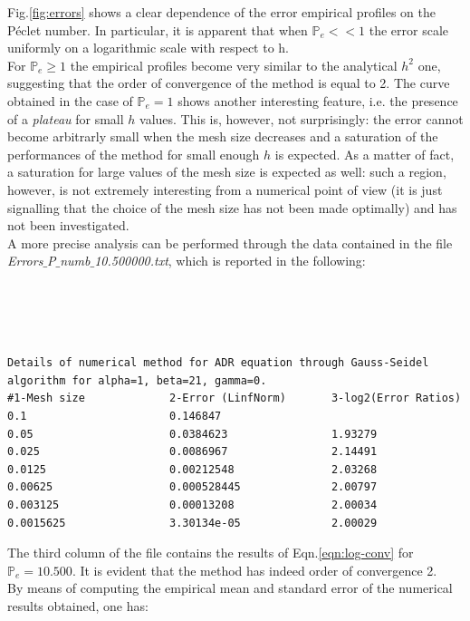 \documentclass[11pt]{article}
\theoremstyle{theorem}
\theoremstyle{definition}
\begin{document}
Fig.\ref{fig:errors} shows a clear dependence of the error empirical profiles on the P\'{e}clet number. In particular, it is apparent that when $\mathbb{P}_e<<1$ the error scale uniformly on a logarithmic scale with respect to h.\\
For $\mathbb{P}_e\ge 1$ the empirical profiles become very similar to the analytical $h^2$ one, suggesting that the order of convergence of the method is equal to 2. The curve obtained in the case of $\mathbb{P}_e=1$ shows another interesting feature, i.e. the presence of a \emph{plateau} for small $h$ values. This is, however, not surprisingly: the error cannot become arbitrarly small when the mesh size decreases and a saturation of the performances of the method for small enough $h$ is expected. As a matter of fact, a saturation for large values of the mesh size is expected as well: such a region, however, is not extremely interesting from a numerical point of view (it is just signalling that the choice of the mesh size has not been made optimally) and has not been investigated.\\
A more precise analysis can be performed through the data contained in the file \emph{Errors$\_$P$\_$numb$\_$10.500000.txt}, which is reported in the following:
\\
\\
\\
\\
\\

  
\begin{lstlisting}
Details of numerical method for ADR equation through Gauss-Seidel algorithm for alpha=1, beta=21, gamma=0.
#1-Mesh size             2-Error (LinfNorm)       3-log2(Error Ratios)     
0.1                      0.146847                 	                        
0.05                     0.0384623                1.93279                  
0.025                    0.0086967                2.14491                  
0.0125                   0.00212548               2.03268                  
0.00625                  0.000528445              2.00797                  
0.003125                 0.00013208               2.00034                  
0.0015625                3.30134e-05              2.00029 
\end{lstlisting}


The third column of the file contains the results of Eqn.\eqref{eqn:log-conv} for $\mathbb{P}_e=10.500$. It is evident that the method has indeed order of convergence 2.\\
By means of computing the empirical mean and standard error of the numerical results obtained, one has:
\end{document}
